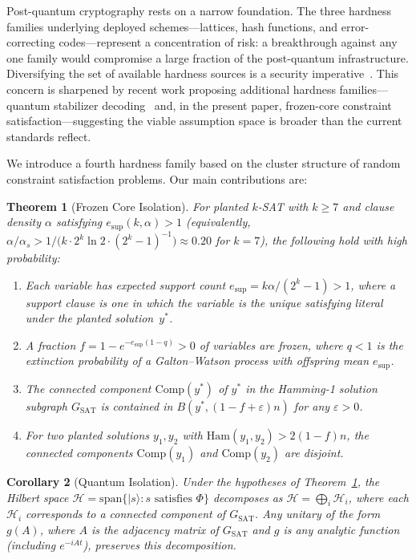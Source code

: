 \documentclass[11pt]{article}
\newtheorem{theorem}{Theorem}
\newtheorem{corollary}[theorem]{Corollary}
\begin{document}
Post-quantum cryptography rests on a narrow foundation.  The three hardness families underlying deployed schemes---lattices, hash functions, and error-correcting codes---represent a concentration of risk: a breakthrough against any one family would compromise a large fraction of the post-quantum infrastructure.  Diversifying the set of available hardness sources is a security imperative~\cite{BL17}. This concern is sharpened by recent work proposing additional hardness families---quantum stabilizer decoding~\cite{LPQR26} and, in the present paper, frozen-core constraint satisfaction---suggesting the viable assumption space is broader than the current standards reflect.

We introduce a fourth hardness family based on the cluster structure of random constraint satisfaction problems.  Our main contributions are:

\begin{theorem}[Frozen Core Isolation]\label{thm:fci}
For planted $k$-SAT with $k \geq 7$ and clause density $\alpha$ satisfying $e_{\mathrm{sup}}(k,\alpha) > 1$ (equivalently, $\alpha/\alpha_s > 1/\bigl(k \cdot 2^k \ln 2 \cdot (2^k - 1)^{-1}\bigr) \approx 0.20$ for $k = 7$), the following hold with high probability:
\begin{enumerate}[label=(\roman*)]
\item Each variable has expected support count $e_{\mathrm{sup}} = k\alpha/(2^k - 1) > 1$, where a support clause is one in which the variable is the unique satisfying literal under the planted solution~$y^*$.
\item A fraction $f = 1 - e^{-e_{\mathrm{sup}}(1-q)} > 0$ of variables are frozen, where $q < 1$ is the extinction probability of a Galton--Watson process with offspring mean $e_{\mathrm{sup}}$.
\item The connected component $\mathrm{Comp}(y^*)$ of $y^*$ in the Hamming-1 solution subgraph $G_{\mathrm{SAT}}$ is contained in $B(y^*,(1-f+\varepsilon)n)$ for any $\varepsilon > 0$.
\item For two planted solutions $y_1, y_2$ with $\mathrm{Ham}(y_1,y_2) > 2(1-f)n$, the connected components $\mathrm{Comp}(y_1)$ and $\mathrm{Comp}(y_2)$ are disjoint.
\end{enumerate}
\end{theorem}

\begin{corollary}[Quantum Isolation]\label{cor:qi}
Under the hypotheses of Theorem~\ref{thm:fci}, the Hilbert space $\mathcal{H} = \mathrm{span}\{|s\rangle : s \text{ satisfies } \Phi\}$ decomposes as $\mathcal{H} = \bigoplus_i \mathcal{H}_i$, where each $\mathcal{H}_i$ corresponds to a connected component of $G_{\mathrm{SAT}}$.  Any unitary of the form $g(A)$, where $A$ is the adjacency matrix of $G_{\mathrm{SAT}}$ and $g$ is any analytic function (including $e^{-iAt}$), preserves this decomposition.
\end{corollary}
\end{document}
